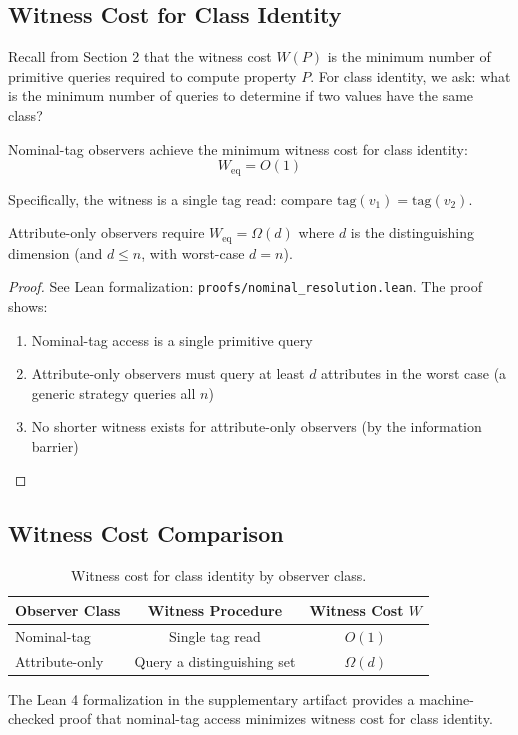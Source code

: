 \subsection{Witness Cost for Class Identity}

Recall from Section 2 that the witness cost $W(P)$ is the minimum number of primitive queries required to compute property $P$. For class identity, we ask: what is the minimum number of queries to determine if two values have the same class?

\begin{theorem}\label{thm:nominal-minimum-witness-cost}
Nominal-tag observers achieve the minimum witness cost for class identity:
$$W_{\text{eq}} = O(1)$$

Specifically, the witness is a single tag read: compare $\text{tag}(v_1) = \text{tag}(v_2)$.

Attribute-only observers require $W_{\text{eq}} = \Omega(d)$ where $d$ is the distinguishing dimension (and $d \le n$, with worst-case $d = n$).
\end{theorem}

\begin{proof}
See Lean formalization: \texttt{proofs/nominal\_resolution.lean}. The proof shows:
\begin{enumerate}
\item Nominal-tag access is a single primitive query
\item Attribute-only observers must query at least $d$ attributes in the worst case (a generic strategy queries all $n$)
\item No shorter witness exists for attribute-only observers (by the information barrier)
\end{enumerate}
\end{proof}

\subsection{Witness Cost Comparison}

\begin{table}[h]
\centering
\begin{tabular}{|l|c|c|}
\hline
\textbf{Observer Class} & \textbf{Witness Procedure} & \textbf{Witness Cost $W$} \\
\hline
Nominal-tag & Single tag read & $O(1)$ \\
Attribute-only & Query a distinguishing set & $\Omega(d)$ \\
\hline
\end{tabular}
\caption{Witness cost for class identity by observer class.}
\end{table}

The Lean 4 formalization in the supplementary artifact provides a machine-checked proof that nominal-tag access minimizes witness cost for class identity.
